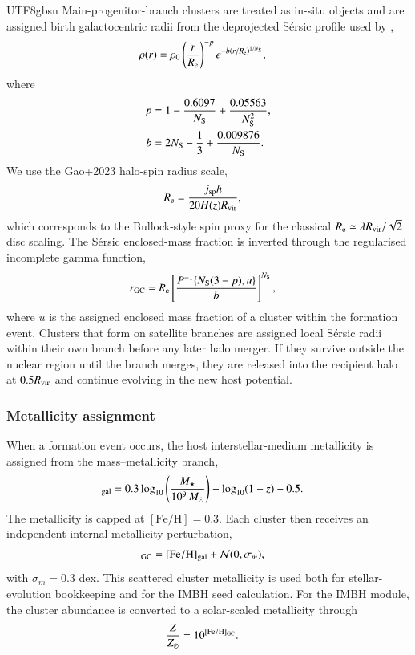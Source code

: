\documentclass[trackchanges, twocolappendix, twocolumn]{aastex701}
\begin{document}
\begin{CJK*}{UTF8}{gbsn}
Main-progenitor-branch clusters are treated as in-situ objects and are assigned birth galactocentric radii from the deprojected S{\'e}rsic profile used by \cite{Gao+2024GC},
\begin{align}
\rho(r) & = \rho_0 \left(\dfrac{r}{R_{\rm e}}\right)^{-p}
e^{-b\left(r / R_{\rm e}\right)^{1 / N_{\rm S}}},
\label{eq:sersic_density}
\end{align}
where
\begin{align}
p & = 1 - \dfrac{0.6097}{N_{\rm S}} + \dfrac{0.05563}{N_{\rm S}^2}, \\
b & = 2 N_{\rm S} - \dfrac{1}{3} + \dfrac{0.009876}{N_{\rm S}}.
\end{align}
We use the Gao+2023 halo-spin radius scale,
\begin{align}
R_{\rm e} & = \dfrac{j_{\rm sp} h}{20 H(z) R_{\rm vir}},
\end{align}
which corresponds to the Bullock-style spin proxy for the classical $R_{\rm e} \simeq \lambda R_{\rm vir} / \sqrt{2}$ disc scaling. The S{\'e}rsic enclosed-mass fraction is inverted through the regularised incomplete gamma function,
\begin{align}
r_{\rm GC} & = R_{\rm e}
\left[\dfrac{P^{-1}\{N_{\rm S}(3 - p), u\}}{b}\right]^{N_{\rm S}},
\end{align}
where $u$ is the assigned enclosed mass fraction of a cluster within the formation event. Clusters that form on satellite branches are assigned local S{\'e}rsic radii within their own branch before any later halo merger. If they survive outside the nuclear region until the branch merges, they are released into the recipient halo at $0.5R_{\rm vir}$ and continue evolving in the new host potential.

\subsubsection{Metallicity assignment} \label{subsubsect:metallicity_assignment}

When a formation event occurs, the host interstellar-medium metallicity is assigned from the \cite{Chen&Gnedin2024aGC} mass--metallicity branch,
\begin{align}
[\mathrm{Fe}/\mathrm{H}]_{\rm gal}
& = 0.3 \log_{10}\left(\dfrac{M_{\star}}{10^9\,M_\odot}\right)
- \log_{10}(1 + z) - 0.5 .
\label{eq:chen_mzr}
\end{align}
The metallicity is capped at $[\mathrm{Fe}/\mathrm{H}] = 0.3$. Each cluster then receives an independent internal metallicity perturbation,
\begin{align}
[\mathrm{Fe}/\mathrm{H}]_{\rm GC}
& = [\mathrm{Fe}/\mathrm{H}]_{\rm gal} + \mathcal{N}(0, \sigma_m),
\end{align}
with $\sigma_m = 0.3$ dex. This scattered cluster metallicity is used both for stellar-evolution bookkeeping and for the IMBH seed calculation. For the IMBH module, the cluster abundance is converted to a solar-scaled metallicity through
\begin{align}
\dfrac{Z}{Z_{\odot}} & = 10^{[\mathrm{Fe}/\mathrm{H}]_{\rm GC}}.
\label{eq:metallicity_transfer}
\end{align}


\end{CJK*}
\end{document}
